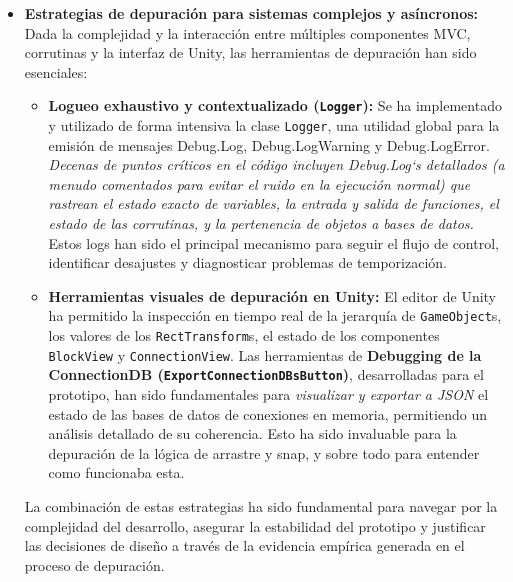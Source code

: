 \begin{itemize}
	\item \textbf{Estrategias de depuración para sistemas complejos y asíncronos:} Dada la complejidad y la interacción entre múltiples componentes MVC, corrutinas y la interfaz de Unity, las herramientas de depuración han sido esenciales:
	\begin{itemize}
		\item \textbf{Logueo exhaustivo y contextualizado (\texttt{Logger}):} Se ha implementado y utilizado de forma intensiva la clase \texttt{Logger}, una utilidad global para la emisión de mensajes Debug.Log, Debug.LogWarning y Debug.LogError. \textit{Decenas de puntos críticos en el código incluyen Debug.Log`s detallados (a menudo comentados para evitar el ruido en la ejecución normal) que rastrean el estado exacto de variables, la entrada y salida de funciones, el estado de las corrutinas, y la pertenencia de objetos a bases de datos.} Estos logs han sido el principal mecanismo para seguir el flujo de control, identificar desajustes y diagnosticar problemas de temporización.
		\item \textbf{Herramientas visuales de depuración en Unity:} El editor de Unity ha permitido la inspección en tiempo real de la jerarquía de \texttt{GameObject}s, los valores de los \texttt{RectTransform}s, el estado de los componentes \texttt{BlockView} y \texttt{ConnectionView}. Las herramientas de \textbf{Debugging de la ConnectionDB (\texttt{ExportConnectionDBsButton})}, desarrolladas para el prototipo, han sido fundamentales para \textit{visualizar y exportar a JSON} el estado de las bases de datos de conexiones en memoria, permitiendo un análisis detallado de su coherencia. Esto ha sido invaluable para la depuración de la lógica de arrastre y snap, y sobre todo para entender como funcionaba esta.
	\end{itemize}
	La combinación de estas estrategias ha sido fundamental para navegar por la complejidad del desarrollo, asegurar la estabilidad del prototipo y justificar las decisiones de diseño a través de la evidencia empírica generada en el proceso de depuración.
\end{itemize}
